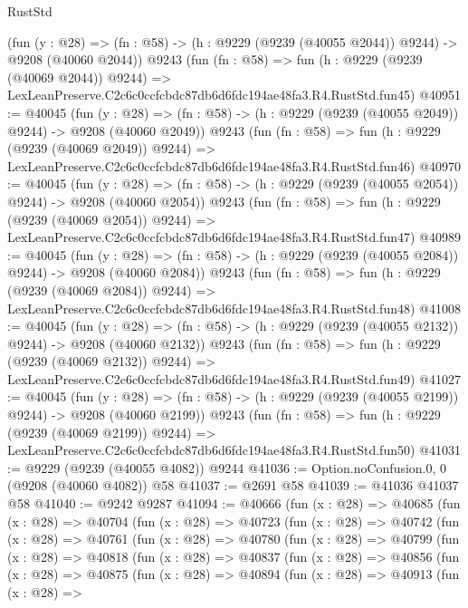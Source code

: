 \begin{lexlean}{RustStd}
\begin{coremodule}
    (fun (y : @28) =>
    (fn : @58) -> (h : @9229 (@9239 (@40055 @2044)) @9244) -> @9208 (@40060 @2044))
    @9243
    (fun (fn : @58) =>
    fun (h : @9229 (@9239 (@40069 @2044)) @9244) =>
    LexLeanPreserve.C2c6c0ccfcbdc87db6d6fdc194ae48fa3.R4.RustStd.fun45)
@40951 := @40045
    (fun (y : @28) =>
    (fn : @58) -> (h : @9229 (@9239 (@40055 @2049)) @9244) -> @9208 (@40060 @2049))
    @9243
    (fun (fn : @58) =>
    fun (h : @9229 (@9239 (@40069 @2049)) @9244) =>
    LexLeanPreserve.C2c6c0ccfcbdc87db6d6fdc194ae48fa3.R4.RustStd.fun46)
@40970 := @40045
    (fun (y : @28) =>
    (fn : @58) -> (h : @9229 (@9239 (@40055 @2054)) @9244) -> @9208 (@40060 @2054))
    @9243
    (fun (fn : @58) =>
    fun (h : @9229 (@9239 (@40069 @2054)) @9244) =>
    LexLeanPreserve.C2c6c0ccfcbdc87db6d6fdc194ae48fa3.R4.RustStd.fun47)
@40989 := @40045
    (fun (y : @28) =>
    (fn : @58) -> (h : @9229 (@9239 (@40055 @2084)) @9244) -> @9208 (@40060 @2084))
    @9243
    (fun (fn : @58) =>
    fun (h : @9229 (@9239 (@40069 @2084)) @9244) =>
    LexLeanPreserve.C2c6c0ccfcbdc87db6d6fdc194ae48fa3.R4.RustStd.fun48)
@41008 := @40045
    (fun (y : @28) =>
    (fn : @58) -> (h : @9229 (@9239 (@40055 @2132)) @9244) -> @9208 (@40060 @2132))
    @9243
    (fun (fn : @58) =>
    fun (h : @9229 (@9239 (@40069 @2132)) @9244) =>
    LexLeanPreserve.C2c6c0ccfcbdc87db6d6fdc194ae48fa3.R4.RustStd.fun49)
@41027 := @40045
    (fun (y : @28) =>
    (fn : @58) -> (h : @9229 (@9239 (@40055 @2199)) @9244) -> @9208 (@40060 @2199))
    @9243
    (fun (fn : @58) =>
    fun (h : @9229 (@9239 (@40069 @2199)) @9244) =>
    LexLeanPreserve.C2c6c0ccfcbdc87db6d6fdc194ae48fa3.R4.RustStd.fun50)
@41031 := @9229 (@9239 (@40055 @4082)) @9244
@41036 := Option.noConfusion.{0, 0} (@9208 (@40060 @4082)) @58
@41037 := @2691 @58
@41039 := @41036 @41037 @58
@41040 := @9242 @9287
@41094 := @40666
    (fun (x : @28) =>
    @40685
      (fun (x : @28) =>
      @40704
        (fun (x : @28) =>
        @40723
          (fun (x : @28) =>
          @40742
            (fun (x : @28) =>
            @40761
              (fun (x : @28) =>
              @40780
                (fun (x : @28) =>
                @40799
                  (fun (x : @28) =>
                  @40818
                    (fun (x : @28) =>
                    @40837
                      (fun (x : @28) =>
                      @40856
                        (fun (x : @28) =>
                        @40875
                          (fun (x : @28) =>
                          @40894
                            (fun (x : @28) =>
                            @40913
                              (fun (x : @28) =>

\end{coremodule}
\end{lexlean}
